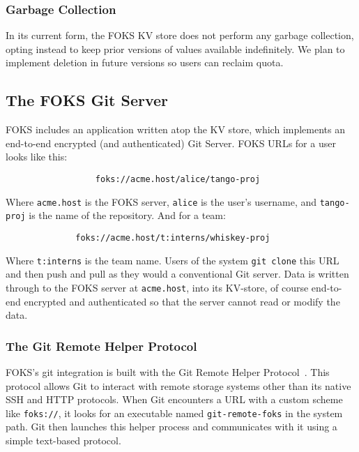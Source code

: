 \subsubsection{Garbage Collection}

In its current form, the FOKS KV store does not perform any garbage collection,
opting instead to keep prior versions of values available indefinitely. We plan
to implement deletion in future versions so users can reclaim quota. 

\subsection{The FOKS Git Server}

FOKS includes an application written atop the KV store, which implements an
end-to-end encrypted (and authenticated) Git Server. FOKS URLs for 
a user looks like this:
%
\begin{verbatim}
                  foks://acme.host/alice/tango-proj
\end{verbatim}
%
Where \texttt{acme.host} is the FOKS server, \texttt{alice} is the user's
username, and \texttt{tango-proj} is the name of the repository. And
for a team:
%
\begin{center}
\begin{verbatim}
              foks://acme.host/t:interns/whiskey-proj
\end{verbatim}
\end{center}
%
Where \texttt{t:interns} is the team name. Users of the system
\texttt{git clone} this URL and then push and pull as
they would a conventional Git server. Data is written through to
the FOKS server at \texttt{acme.host}, into its KV-store,
of course end-to-end encrypted and authenticated so that the server
cannot read or modify the data.

\subsubsection{The Git Remote Helper Protocol}

FOKS's git integration is built with the Git Remote Helper 
Protocol~\cite{git-remote-helper}.  This protocol allows Git to interact with
remote storage systems other than its native SSH and HTTP protocols. When Git
encounters a URL with a custom scheme like \texttt{foks://}, it looks for an
executable named \texttt{git-remote-foks} in the system path. Git then launches
this helper process and communicates with it using a simple text-based protocol.

